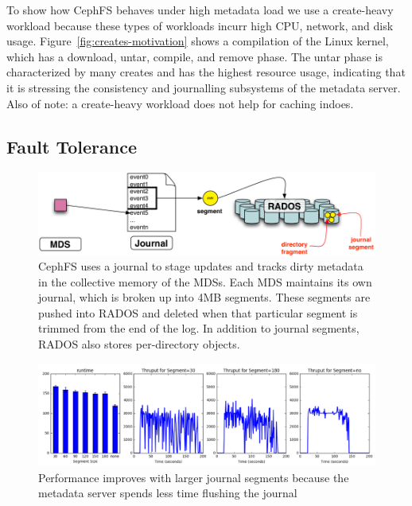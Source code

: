 \documentclass[preprint]{sigplanconf-eurosys}
\begin{document}
To show how CephFS behaves under high metadata load we use a create-heavy
workload because these types of workloads incurr high CPU, network, and disk
usage.  Figure~\ref{fig:creates-motivation} shows a compilation of the Linux
kernel, which has a download, untar, compile, and remove phase. The untar phase
is characterized by many creates and has the highest resource usage, indicating
that it is stressing the consistency and journalling subsystems of the metadata
server. Also of note: a create-heavy workload does not help for caching indoes.

\subsection{Fault Tolerance}
\begin{figure}[tb] \centering
\includegraphics[width=1\textwidth]{./figures/journal.png} 
\caption{CephFS uses a journal to stage updates and tracks dirty metadata in
the collective memory of the MDSs. Each MDS maintains its own journal, which is
broken up into 4MB segments. These segments are pushed into RADOS and deleted
when that particular segment is trimmed from the end of the log. In addition to
journal segments, RADOS also stores per-directory objects. \label{fig:journal}}
\end{figure}

\begin{figure}[tb]%
\centering
\includegraphics[width=180mm]{figures/throughput-journal.png}
\caption{Performance improves with larger journal segments because the metadata
server spends less time flushing the journal }\label{fig:throughput-journal}
\end{figure}
\end{document}
